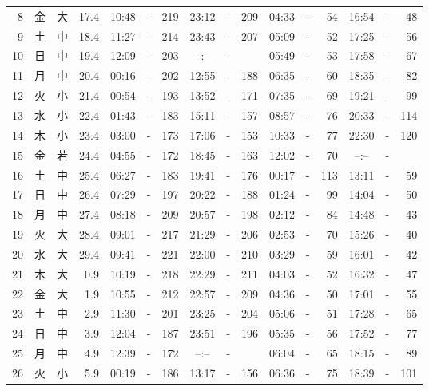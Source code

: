 \documentclass[12pt.a4j]{jsarticle}
\begin{document}
\begin{center}
\begin{table}[ht]
\begin{tabular}{|rc|cr|ccrccr|ccrccr|}
 8 & 金 & 大 & 17.4 &  10:48 &-& 219  &  23:12 &-& 209  &   04:33 &-&  54  &   16:54 &-&  48  \\
 9 & 土 & 中 & 18.4 &  11:27 &-& 214  &  23:43 &-& 207  &   05:09 &-&  52  &   17:25 &-&  56  \\
10 & 日 & 中 & 19.4 &  12:09 &-& 203  &  --:-- &-&     &   05:49 &-&  53  &   17:58 &-&  67  \\
11 & 月 & 中 & 20.4 &  00:16 &-& 202  &  12:55 &-& 188  &   06:35 &-&  60  &   18:35 &-&  82  \\
12 & 火 & 小 & 21.4 &  00:54 &-& 193  &  13:52 &-& 171  &   07:35 &-&  69  &   19:21 &-&  99  \\
13 & 水 & 小 & 22.4 &  01:43 &-& 183  &  15:11 &-& 157  &   08:57 &-&  76  &   20:33 &-& 114  \\
14 & 木 & 小 & 23.4 &  03:00 &-& 173  &  17:06 &-& 153  &   10:33 &-&  77  &   22:30 &-& 120  \\
15 & 金 & 若 & 24.4 &  04:55 &-& 172  &  18:45 &-& 163  &   12:02 &-&  70  &   --:-- &-&     \\
16 & 土 & 中 & 25.4 &  06:27 &-& 183  &  19:41 &-& 176  &   00:17 &-& 113  &   13:11 &-&  59  \\
17 & 日 & 中 & 26.4 &  07:29 &-& 197  &  20:22 &-& 188  &   01:24 &-&  99  &   14:04 &-&  50  \\
18 & 月 & 中 & 27.4 &  08:18 &-& 209  &  20:57 &-& 198  &   02:12 &-&  84  &   14:48 &-&  43  \\
19 & 火 & 大 & 28.4 &  09:01 &-& 217  &  21:29 &-& 206  &   02:53 &-&  70  &   15:26 &-&  40  \\
20 & 水 & 大 & 29.4 &  09:41 &-& 221  &  22:00 &-& 210  &   03:29 &-&  59  &   16:01 &-&  42  \\
21 & 木 & 大 &  0.9 &  10:19 &-& 218  &  22:29 &-& 211  &   04:03 &-&  52  &   16:32 &-&  47  \\
22 & 金 & 大 &  1.9 &  10:55 &-& 212  &  22:57 &-& 209  &   04:36 &-&  50  &   17:01 &-&  55  \\
23 & 土 & 中 &  2.9 &  11:30 &-& 201  &  23:25 &-& 204  &   05:06 &-&  51  &   17:28 &-&  65  \\
24 & 日 & 中 &  3.9 &  12:04 &-& 187  &  23:51 &-& 196  &   05:35 &-&  56  &   17:52 &-&  77  \\
25 & 月 & 中 &  4.9 &  12:39 &-& 172  &  --:-- &-&     &   06:04 &-&  65  &   18:15 &-&  89  \\
26 & 火 & 小 &  5.9 &  00:19 &-& 186  &  13:17 &-& 156  &   06:36 &-&  75  &   18:39 &-& 101  \\

\end{tabular}
\end{table}
\end{center}
\end{document}
